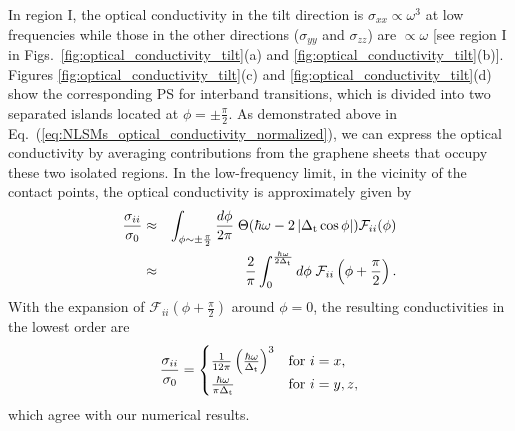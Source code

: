 \documentclass[aps,twocolumn,floatfix]{revtex4-1}
\begin{document}
In region I, the optical conductivity in the tilt direction is $\sigma_{xx} \propto \omega^3$ at low frequencies while those in the other directions ($\sigma_{yy}$ and $\sigma_{zz}$) are $\propto \omega$ [see region I in Figs.~\ref{fig:optical_conductivity_tilt}(a) and \ref{fig:optical_conductivity_tilt}(b)].
Figures \ref{fig:optical_conductivity_tilt}(c) and \ref{fig:optical_conductivity_tilt}(d) show the corresponding PS for interband transitions, which is divided into two separated islands located at $\phi=\pm\frac{\pi}{2}$.
As demonstrated above in Eq.~(\ref{eq:NLSMs_optical_conductivity_normalized}), we can express the optical conductivity by averaging contributions from the graphene sheets that occupy these two isolated regions. In the low-frequency limit, in the vicinity of the contact points, the optical conductivity is approximately given by
\begin{eqnarray}
\label{eq:NLSMs_optical_conductivity_notilt}
{\sigma_{ii} \over \sigma_0}
&\approx&
\int_{\phi\sim\pm\frac{\pi}{2}} \frac{d\phi}{2\pi}\; \Theta({\hbar\omega-2\left|\Delta_{\rm t}\cos{\phi}\right|}) \mathcal{F}_{ii}(\phi)\nonumber\\
&\approx& \frac{2}{\pi} \int^{\frac{\hbar\omega}{2\Delta_{\rm t}}}_{0} d\phi\; \mathcal{F}_{ii}\left(\phi+\frac{\pi}{2}\right).
\end{eqnarray}
With the expansion of $\mathcal{F}_{ii}\left(\phi+\frac{\pi}{2}\right)$
around $\phi=0$, the resulting conductivities in the lowest order are
\begin{equation}
\label{eq:NLSMs_optical_conductivity_noEf}
{\sigma_{ii} \over \sigma_0}=
\begin{cases}
\frac{1}{12\pi}\left(\frac{\hbar\omega}{\Delta_{\rm t}}\right)^3 &\text{for $i=x$},\\
\frac{\hbar\omega}{\pi\Delta_{\rm t}} &\text{for $i=y,z$},
\end{cases}
\end{equation}
which agree with our numerical results.
\end{document}
